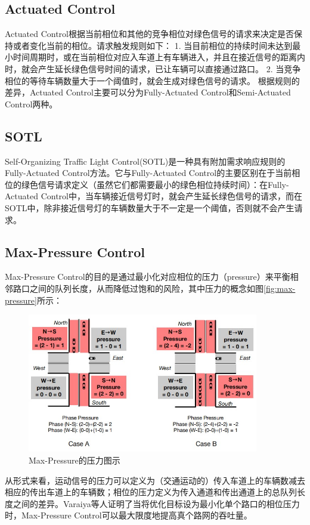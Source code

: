\subsection{Actuated Control}
Actuated Control根据当前相位和其他的竞争相位对绿色信号的请求来决定是否保持或者变化当前的相位。请求触发规则如下：
1. 当目前相位的持续时间未达到最小时间周期时，或在当前相位对应入车道上有车辆进入，并且在接近信号的距离内时，就会产生延长绿色信号时间的请求，已让车辆可以直接通过路口。 
2. 当竞争相位的等待车辆数量大于一个阈值时，就会生成对绿色信号的请求。
根据规则的差异，Actuated Control主要可以分为Fully-Actuated Control和Semi-Actuated Control两种。

\subsection{SOTL}
Self-Organizing Traffic Light Control(SOTL)是一种具有附加需求响应规则的Fully-Actuated Control方法。它与Fully-Actuated Control的主要区别在于当前相位的绿色信号请求定义（虽然它们都需要最小的绿色相位持续时间）：在Fully-Actuated Control中，当车辆接近信号灯时，就会产生延长绿色信号的请求，而在SOTL中，除非接近信号灯的车辆数量大于不一定是一个阈值，否则就不会产生请求。

\subsection{Max-Pressure Control}
Max-Pressure Control的目的是通过最小化对应相位的压力（pressure）来平衡相邻路口之间的队列长度，从而降低过饱和的风险，其中压力的概念如图\autoref{fig:max-pressure}所示：
\begin{figure}[htb]
    \includegraphics[width=0.9\textwidth]{fig/max-pressure.jpg}
    \caption{Max-Pressure的压力图示}
    \label{fig:max-pressure}
\end{figure}
从形式来看，运动信号的压力可以定义为（交通运动的）传入车道上的车辆数减去相应的传出车道上的车辆数；相位的压力定义为传入通道和传出通道上的总队列长度之间的差异。Varaiya等人证明了当将优化目标设为最小化单个路口的相位压力时，Max-Pressure Control可以最大限度地提高真个路网的吞吐量。

